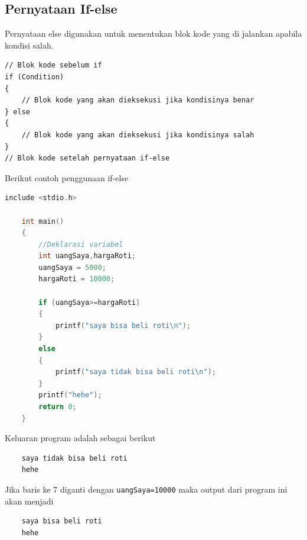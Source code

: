 \subsection{Pernyataan If-else}
Pernyataan else digunakan untuk menentukan blok kode yang di jalankan apabila kondisi salah.
\begin{verbatim}
// Blok kode sebelum if
if (Condition) 
{
	// Blok kode yang akan dieksekusi jika kondisinya benar
} else
{
	// Blok kode yang akan dieksekusi jika kondisinya salah
}
// Blok kode setelah pernyataan if-else
\end{verbatim}
Berikut contoh penggunaan if-else
\begin{lstlisting}[language=c,caption = if-else example,label=lst:ifelseexample01]
	include <stdio.h>
	
	int main()
	{
		//Deklarasi variabel 
		int uangSaya,hargaRoti;
		uangSaya = 5000;
		hargaRoti = 10000;
		
		if (uangSaya>=hargaRoti)
		{
		    printf("saya bisa beli roti\n");
		}
		else
		{
	        printf("saya tidak bisa beli roti\n");	
		}
		printf("hehe");
		return 0;
	}
\end{lstlisting}
Keluaran program adalah sebagai berikut
\begin{verbatim}
    saya tidak bisa beli roti
    hehe
\end{verbatim}
Jika baris ke 7 diganti dengan \verb|uangSaya=10000| maka output dari program ini akan menjadi
\begin{verbatim}
    saya bisa beli roti
    hehe
\end{verbatim}

